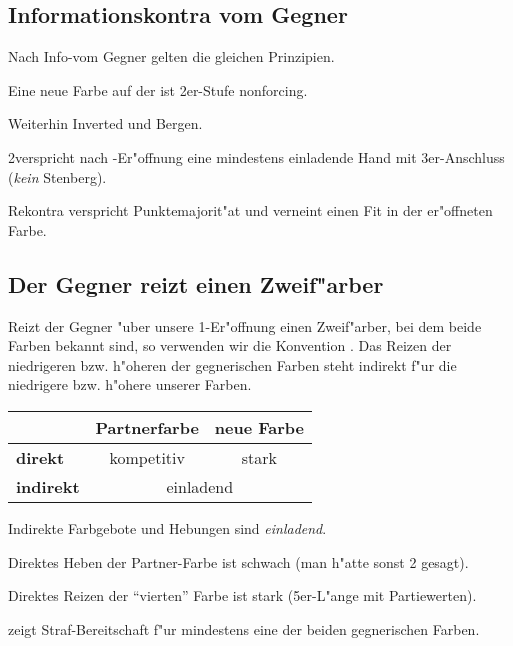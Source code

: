\subsection{Informationskontra vom Gegner}

Nach Info-\kontra vom Gegner gelten die gleichen Prinzipien.
\begin{compactitem}
\item Eine neue Farbe auf der ist 2er-Stufe nonforcing.
\item Weiterhin Inverted und Bergen.
\item 2\SA verspricht nach \ofa-Er"offnung eine mindestens einladende Hand mit
  3\pl{}er-Anschluss (\emph{kein} Stenberg).
\item Rekontra verspricht Punktemajorit"at und verneint einen Fit in der
  er"offneten Farbe.
\end{compactitem}

\subsection{Der Gegner reizt einen Zweif"arber }

Reizt der Gegner "uber unsere 1\anybid-Er"offnung einen Zweif"arber, bei
dem beide Farben bekannt sind, so verwenden wir die Konvention
. Das Reizen der niedrigeren bzw. h"oheren der
gegnerischen Farben steht indirekt f"ur die niedrigere bzw. h"ohere unserer
Farben.
%
\begin{center}
\begin{tabular}[t]{|l|c|c|}
\hline
 & \textbf{Partnerfarbe} & \textbf{neue Farbe}\\
\hline
\hline
\textbf{direkt} & kompetitiv & stark \\
\hline
\textbf{indirekt} & \multicolumn{2}{c|}{einladend}\\
\hline
\end{tabular}
\end{center}

\begin{compactitem}
\item Indirekte Farbgebote und Hebungen sind \emph{einladend}.
\item Direktes Heben der Partner-Farbe ist schwach (man h"atte sonst 2\anybid
  gesagt).
\item Direktes Reizen der "`vierten"' Farbe ist stark (5\pl{}er-L"ange mit
  Partiewerten).
\item {} zeigt Straf-Bereitschaft f"ur mindestens eine der
  beiden gegnerischen Farben.
\end{compactitem}


